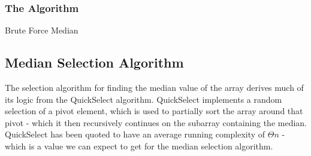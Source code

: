 \documentclass{article}
\begin{document}
        \subsubsection{The Algorithm}
            \begin{algorithm}[H]
                \caption{Brute Force Median}
                \begin{algorithmic}[1]
                                \Else
                                    \EndIf
                                \EndIf
                            \EndFor
                            \EndIf
                        \EndFor
                    \EndFunction
                \end{algorithmic}
            \end{algorithm}

    \subsection{Median Selection Algorithm}
        The selection algorithm for finding the median value of the array derives much of its logic from the QuickSelect algorithm. QuickSelect implements a random selection of a pivot element, which is used to partially sort the array around that pivot - which it then recursively continues on the subarray containing the median. QuickSelect has been quoted to have an average running complexity of $\Theta{n}$ \cite{cormen} - which is a value we can expect to get for the median selection algorithm.
\end{document}

